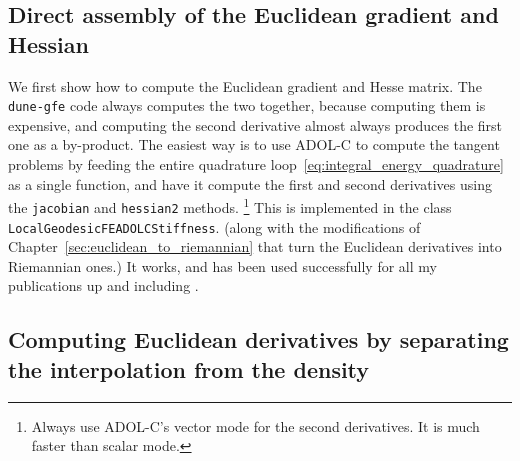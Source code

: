 \documentclass[a4paper]{article}
\newcommand{\cpp}[1]{\lstinline[basicstyle=\ttfamily]!#1!}
\newcommand{\dunemodule}[1]{\texttt{#1}}
\begin{document}
\subsection{Direct assembly of the Euclidean gradient and Hessian}
\label{sec:direct_assembly}

We first show how to compute the Euclidean gradient and Hesse matrix.
The \dunemodule{dune-gfe} code always computes the two together, because
computing them is expensive, and computing the second derivative almost
always produces the first one as a by-product.
The easiest way is to use ADOL-C to compute the tangent problems by feeding
the entire quadrature loop~\eqref{eq:integral_energy_quadrature} as a
single function, and have it
compute the first and second derivatives using the \cpp{jacobian} and
\cpp{hessian2} methods.%
%
\footnote{Always use ADOL-C's vector mode for the second derivatives.
 It is much faster than scalar mode.}
%
This is implemented in the class \cpp{LocalGeodesicFEADOLCStiffness}.
(along with the modifications of Chapter~\ref{sec:euclidean_to_riemannian} that turn
the Euclidean derivatives into Riemannian ones.)
It works, and has been used successfully for all my publications up and
including \cite{nebel_sander_birsan_neff:2023}.

\subsection{Computing Euclidean derivatives by separating the interpolation from the density}
\end{document}
